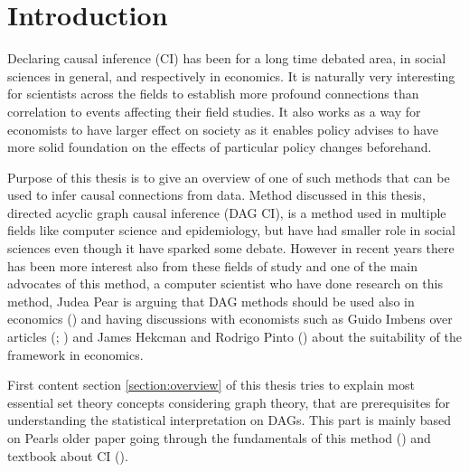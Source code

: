 \documentclass[main=english,12pt,a4paper,pdftex,econ,utf8]{aaltothesis}
\begin{document}


\section{Introduction}

Declaring causal inference (CI) has been for a long time debated area, in social sciences in general, and respectively in economics. It is naturally very interesting for scientists across the fields to establish more profound connections than correlation to events affecting their field studies. It also works as a way for economists to have larger effect on society as it enables policy advises to have more solid foundation on the effects of particular policy changes beforehand.

Purpose of this thesis is to give an overview of one of such methods that can be used to infer causal connections from data. Method discussed in this thesis, directed acyclic graph causal inference (DAG CI), is a method used in multiple fields like computer science and epidemiology, but have had smaller role in social sciences even though it have sparked some debate. However in recent years there has been more interest also from these fields of study and one of the main advocates of this method, a computer scientist who have done research on this method, Judea Pear is arguing that DAG methods should be used also in economics (\cite{pearl_2014}) and having discussions with economists such as Guido Imbens over articles (\cite{Imbens2014}; \cite{imbes2020}) and James Hekcman and Rodrigo Pinto (\cite{Heckman2015}) about the suitability of the framework in economics.

First content section \ref{section:overview} of this thesis tries to explain most essential set theory concepts considering graph theory, that are prerequisites for understanding the statistical interpretation on DAGs. This part is mainly based on Pearls older paper going through the fundamentals of this method (\cite{Pearl1998}) and textbook about CI (\cite{Peters2017}).
\end{document}
